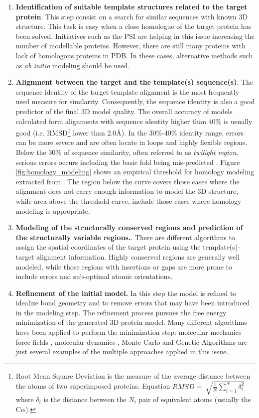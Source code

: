 \documentclass[12pt, a4paper,twoside]{tesi_upf}
\begin{document}
\begin{enumerate}
\item \textbf{Identification of suitable template structures related to the target protein}. This step consist on a search for similar sequences with known 3D structure. This task is easy when a close homologue of the target protein has been solved. Initiatives such as the PSI\cite{Norvell2007} are helping in this issue increasing the number of modellable proteins. However, there are still many proteins with lack of homologous proteins in PDB. In these cases, alternative methods such as \textit{ab initio} modeling should be used.  

\item \textbf{Alignment between the target and the template(s) sequence(s)}. The sequence identity of the target-template alignment is the most frequently used measure for similarity. Consequently, the sequence identity is also a good predictor of the final 3D model quality. The overall accuracy of models calculated form alignments with sequence identity higher than 40$\%$ is usually good (i.e. RMSD\footnote{Root Mean Square Deviation is the measure of the average distance between the atoms of two superimposed proteins. Equation $RMSD=\sqrt[]{\frac{1}{N} \sum\limits_{i=1}^N \delta_i^2}$ where $\delta_i$ is the distance between the $N_i$ pair of equivalent atoms (usually the C$\alpha$).}  lower than 2.0\AA). In the 30$\%$-40$\%$ identity range, errors can be more severe and are often locate in loops and highly flexible regions. Below the 30$\%$ of sequence similarity, often referred to as \textit{twilight region}, serious errors occurs including the basic fold being mis-predicted \cite{Baker2001, twilight1996}.
Figure \ref{fig:homology_modeling} shows an empirical threshold for  homology modeling extracted from \cite{Sander1991}. The region below the curve covers those cases where the alignment does not carry enough information to model the 3D structure, while area above the threshold curve, include those cases where homology modeling is appropriate.  
\item \textbf{Modeling of the structurally conserved regions and prediction of the structurally variable regions.}. There are different algorithms to assign the spatial coordinates of the target protein using the template(s)-target alignment information. Highly conserved regions are generally well modeled, while those regions with insertions or gaps are more prone to include errors and sub-optimal atomic orientations. 

\item \textbf{Refinement of the initial model.} In this step the model is refined to idealize bond geometry and to remove errors that may have been introduced in the modeling step. The refinement process pursues the free energy minimization of the generated 3D protein model. Many different algorithms have been applied to perform the minimization step: molecular mechanics force fields \cite{PRO1410}, molecular dynamics \cite{Fiser2000}, Monte Carlo \cite{Kidera1995} and Genetic Algorithms\cite{McGarrah1993} are just several examples of the multiple approaches applied in this issue.
 

\end{enumerate}
\end{document}
